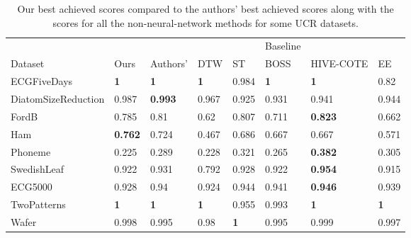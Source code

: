 \begin{table}[h!]
\caption{Our best achieved scores compared to the authors' best achieved scores along with the scores for all the non-neural-network methods for some UCR datasets.}
\label{tab:table1non}
\centering
\begin{tabular}{llllllll}
    \hline
                        &                &                & \vrule    &            &    Baseline        &          &  \\

    Dataset             & Ours           & Authors'       & \vrule   DTW        & ST         & BOSS       & HIVE-COTE      & EE         \\
    \hline
    ECGFiveDays         & \textbf{1}          & \textbf{1}     & \textbf{1}      & 0.984      & \textbf{1} & \textbf{1}     & 0.82       \\
    DiatomSizeReduction & 0.987 & \textbf{0.993} & 0.967      & 0.925      & 0.931      & 0.941          & 0.944      \\
    FordB               & 0.785          & 0.81           & 0.62       & 0.807      & 0.711      & \textbf{0.823} & 0.662      \\
    Ham                 & \textbf{0.762} & 0.724          & 0.467      & 0.686      & 0.667      & 0.667          & 0.571      \\
    Phoneme             & 0.225           & 0.289          & 0.228      & 0.321      & 0.265      & \textbf{0.382} & 0.305      \\
    SwedishLeaf         & 0.922          & 0.931          & 0.792      & 0.928      & 0.922      & \textbf{0.954} & 0.915      \\ \hdashline
    ECG5000             & 0.928          & 0.94          & 0.924      & 0.944      & 0.941      & \textbf{0.946} & 0.939      \\
    TwoPatterns         & \textbf{1}     & \textbf{1}     & \textbf{1} & 0.955      & 0.993      & \textbf{1}     & \textbf{1} \\
    Wafer               & 0.998          & 0.995          & 0.98       & \textbf{1} & 0.995      & 0.999          & 0.997      
    \end{tabular}
\end{table}


